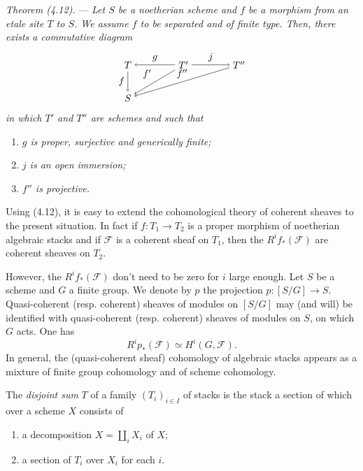 \documentclass[10pt]{article}
\begin{document}
\medskip
\noindent\emph{Theorem (4.12).} --- \emph{Let $S$ be a noetherian scheme and $f$ be a morphism from an etale site $T$ to $S$. We assume $f$ to be separated and of finite type. Then, there exists a commutative diagram}
\[
\begin{tikzpicture}[baseline=(current bounding box.center)]
\node (T) at (0,1.2) {$T$};
\node (Tp) at (2.0,1.2) {$T'$};
\node (Tpp) at (4.0,1.2) {$T''$};
\node (S) at (0,0) {$S$};
\draw[->] (Tp) -- node[above] {$g$} (T);
\draw[->] (Tp) -- node[above] {$j$} (Tpp);
\draw[->] (T) -- node[left] {$f$} (S);
\draw[->] (Tp) -- node[above left] {$f'$} (S);
\draw[->] (Tpp) -- node[above] {$f''$} (S);
\end{tikzpicture}
\]
\emph{in which $T'$ and $T''$ are schemes and such that}
\begin{enumerate}[label=(\roman*)]
\item \emph{$g$ is proper, surjective and generically finite;}
\item \emph{$j$ is an open immersion;}
\item \emph{$f''$ is projective.}
\end{enumerate}

Using (4.12), it is easy to extend the cohomological theory of coherent sheaves to the present situation. In fact if $f:T_1\to T_2$ is a proper morphism of noetherian algebraic stacks and if $\mathscr F$ is a coherent sheaf on $T_1$, then the $R^i f_*(\mathscr F)$ are coherent sheaves on $T_2$.

However, the $R^if_*(\mathscr F)$ don't need to be zero for $i$ large enough. Let $S$ be a scheme and $G$ a finite group. We denote by $p$ the projection $p:[S/G]\to S$. Quasi-coherent (resp. coherent) sheaves of modules on $[S/G]$ may (and will) be identified with quasi-coherent (resp. coherent) sheaves of modules on $S$, on which $G$ acts. One has
\[
R^i p_*(\mathscr F)\simeq H^i(G,\mathscr F).
\]
In general, the (quasi-coherent sheaf) cohomology of algebraic stacks appears as a mixture of finite group cohomology and of scheme cohomology.

The \emph{disjoint sum} $T$ of a family $(T_i)_{i\in I}$ of stacks is the stack a section of which over a scheme $X$ consists of
\begin{enumerate}[label=(\roman*)]
\item a decomposition $X=\coprod_i X_i$ of $X$;
\item a section of $T_i$ over $X_i$ for each $i$.
\end{enumerate}
\end{document}
